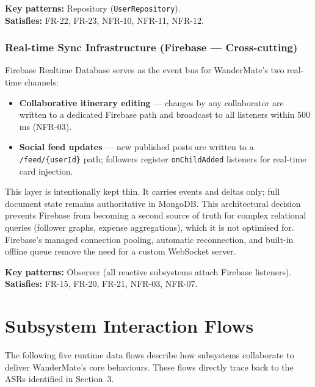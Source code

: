 \documentclass[12pt, a4paper]{article}
\begin{document}
\begin{tcolorbox}[notebox]
  \textbf{Key patterns:} Repository (\texttt{UserRepository}).\\[2pt]
  \textbf{Satisfies:} FR-22, FR-23, NFR-10, NFR-11, NFR-12.
\end{tcolorbox}

\subsubsection{Real-time Sync Infrastructure (Firebase --- Cross-cutting)}

Firebase Realtime Database serves as the event bus for WanderMate's two real-time channels:
\begin{itemize}
  \item \textbf{Collaborative itinerary editing} --- changes by any collaborator are written to a dedicated Firebase path and broadcast to all listeners within 500\,ms (NFR-03).
  \item \textbf{Social feed updates} --- new published posts are written to a \texttt{/feed/\{userId\}} path; followers register \texttt{onChildAdded} listeners for real-time card injection.
\end{itemize}

This layer is intentionally kept thin. It carries events and deltas only; full document state remains authoritative in MongoDB. This architectural decision prevents Firebase from becoming a second source of truth for complex relational queries (follower graphs, expense aggregations), which it is not optimised for. Firebase's managed connection pooling, automatic reconnection, and built-in offline queue remove the need for a custom WebSocket server.

\begin{tcolorbox}[notebox]
  \textbf{Key patterns:} Observer (all reactive subsystems attach Firebase listeners).\\[2pt]
  \textbf{Satisfies:} FR-15, FR-20, FR-21, NFR-03, NFR-07.
\end{tcolorbox}

\section{Subsystem Interaction Flows}

The following five runtime data flows describe how subsystems collaborate to deliver WanderMate's core behaviours. These flows directly trace back to the ASRs identified in Section~3.
\end{document}
